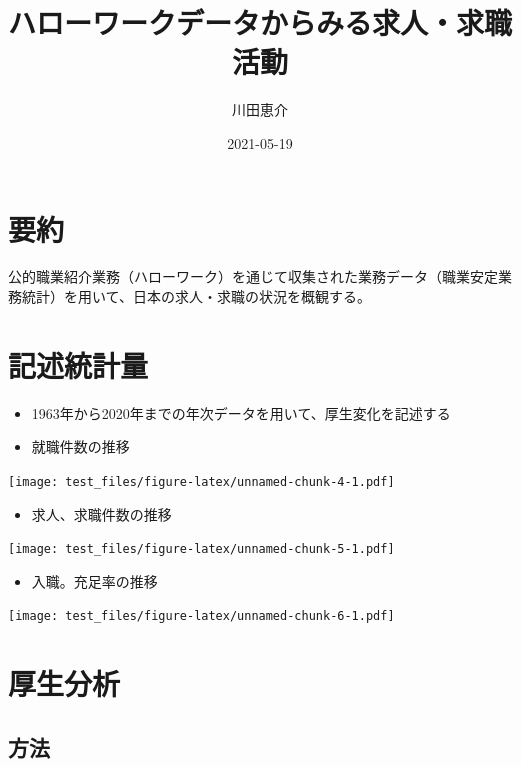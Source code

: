 \documentclass[
]{book}
\title{ハローワークデータからみる求人・求職活動}
\author{川田恵介}
\date{2021-05-19}
\providecommand{\tightlist}{%
  \setlength{\itemsep}{0pt}\setlength{\parskip}{0pt}}
\begin{document}
\maketitle

{
\setcounter{tocdepth}{1}
\tableofcontents
}
\hypertarget{ux8981ux7d04}{%
\chapter{要約}\label{ux8981ux7d04}}

公的職業紹介業務（ハローワーク）を通じて収集された業務データ（職業安定業務統計）を用いて、日本の求人・求職の状況を概観する。

\hypertarget{ux8a18ux8ff0ux7d71ux8a08ux91cf}{%
\chapter{記述統計量}\label{ux8a18ux8ff0ux7d71ux8a08ux91cf}}

\begin{itemize}
\item
  1963年から2020年までの年次データを用いて、厚生変化を記述する
\item
  就職件数の推移
\end{itemize}

\texttt{[image: test\_files/figure-latex/unnamed-chunk-4-1.pdf]}

\begin{itemize}
\tightlist
\item
  求人、求職件数の推移
\end{itemize}

\texttt{[image: test\_files/figure-latex/unnamed-chunk-5-1.pdf]}

\begin{itemize}
\tightlist
\item
  入職。充足率の推移
\end{itemize}

\texttt{[image: test\_files/figure-latex/unnamed-chunk-6-1.pdf]}

\hypertarget{ux539aux751fux5206ux6790}{%
\chapter{厚生分析}\label{ux539aux751fux5206ux6790}}

\hypertarget{ux65b9ux6cd5}{%
\section{方法}\label{ux65b9ux6cd5}}
\end{document}
